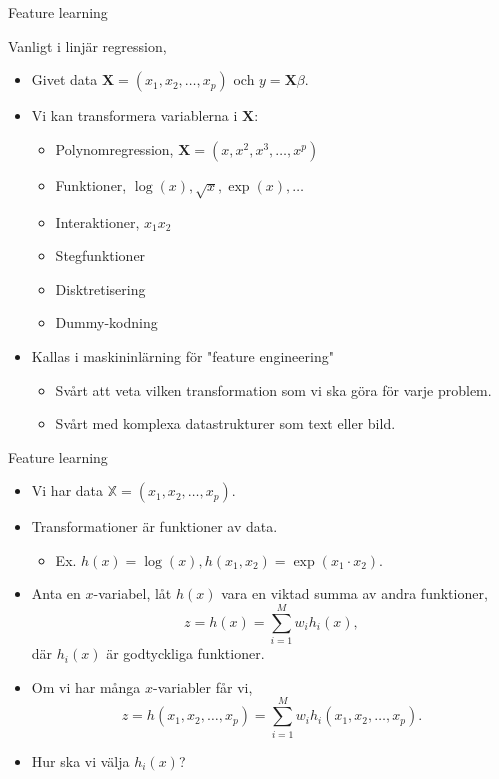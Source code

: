 \documentclass[10pt,english]{beamer}
\begin{document}
\begin{frame}{Feature learning}
    
    Vanligt i linjär regression,
    \begin{itemize}
        \item Givet data $\mathbf{X} = (x_1, x_2, \ldots, x_p)$ och $ y = \mathbf{X} \beta$.
        \item Vi kan transformera variablerna i $\mathbf{X}$:
        \begin{itemize}
            \item Polynomregression, $\mathbf{X} = (x, x^2, x^3, \ldots, x^p)$
            \item Funktioner, $\log(x), \sqrt{x}, \exp(x), \ldots$
            \item Interaktioner, $x_1 x_2$
            \item Stegfunktioner
            \item Disktretisering
            \item Dummy-kodning
        \end{itemize}
        \item Kallas i maskininlärning för "feature engineering"
        \begin{itemize}
            \item Svårt att veta vilken transformation som vi ska göra för varje problem.
            \item Svårt med komplexa datastrukturer som text eller bild.
        \end{itemize}
    \end{itemize}

\end{frame}

\begin{frame}{Feature learning}
    
    \begin{itemize}
        \item Vi har data $\mathbb{X} = (x_1, x_2, \ldots, x_p)$.
        \item Transformationer är funktioner av data.
        \begin{itemize}
            \item Ex. $h(x) = \log(x), h(x_1,x_2) = \exp(x_1 \cdot x_2)$.
        \end{itemize}
        \item Anta en $x$-variabel, låt $h(x)$ vara en viktad summa av andra funktioner,
        \begin{equation*}
            z = h(x) = \sum_{i=1}^{M}w_i h_i(x),
        \end{equation*}
        där $h_i(x)$ är godtyckliga funktioner.
        \item<2-> Om vi har många $x$-variabler får vi,
        \begin{equation*}
            z =  h(x_1, x_2, \ldots, x_p) = \sum_{i=1}^{M} w_i h_i(x_1, x_2, \ldots, x_p).
        \end{equation*}
        \item<2-> Hur ska vi välja $h_i(x)$?
    \end{itemize}

\end{frame}
\end{document}
